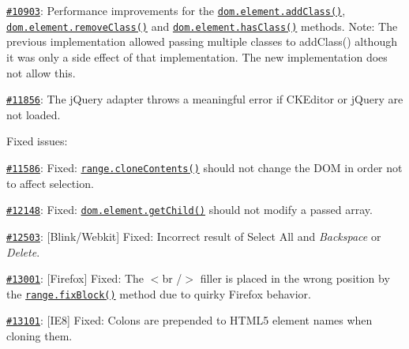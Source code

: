 \begin{DoxyItemize}
\item \href{http://dev.ckeditor.com/ticket/10903}{\tt \#10903}\+: Performance improvements for the \href{http://docs.ckeditor.com/#!/api/CKEDITOR.dom.element-method-addClass}{\tt {\ttfamily dom.\+element.\+add\+Class()}}, \href{http://docs.ckeditor.com/#!/api/CKEDITOR.dom.element-method-removeClass}{\tt {\ttfamily dom.\+element.\+remove\+Class()}} and \href{http://docs.ckeditor.com/#!/api/CKEDITOR.dom.element-method-hasClass}{\tt {\ttfamily dom.\+element.\+has\+Class()}} methods. Note\+: The previous implementation allowed passing multiple classes to {\ttfamily add\+Class()} although it was only a side effect of that implementation. The new implementation does not allow this.
\item \href{http://dev.ckeditor.com/ticket/11856}{\tt \#11856}\+: The j\+Query adapter throws a meaningful error if C\+K\+Editor or j\+Query are not loaded.
\end{DoxyItemize}

Fixed issues\+:


\begin{DoxyItemize}
\item \href{http://dev.ckeditor.com/ticket/11586}{\tt \#11586}\+: Fixed\+: \href{http://docs.ckeditor.com/#!/api/CKEDITOR.dom.range-method-cloneContents}{\tt {\ttfamily range.\+clone\+Contents()}} should not change the D\+OM in order not to affect selection.
\item \href{http://dev.ckeditor.com/ticket/12148}{\tt \#12148}\+: Fixed\+: \href{http://docs.ckeditor.com/#!/api/CKEDITOR.dom.element-method-getChild}{\tt {\ttfamily dom.\+element.\+get\+Child()}} should not modify a passed array.
\item \href{http://dev.ckeditor.com/ticket/12503}{\tt \#12503}\+: \mbox{[}Blink/\+Webkit\mbox{]} Fixed\+: Incorrect result of Select All and {\itshape Backspace} or {\itshape Delete}.
\item \href{http://dev.ckeditor.com/ticket/13001}{\tt \#13001}\+: \mbox{[}Firefox\mbox{]} Fixed\+: The {\ttfamily $<$br /$>$} filler is placed in the wrong position by the \href{http://docs.ckeditor.com/#!/api/CKEDITOR.dom.range-method-fixBlock}{\tt {\ttfamily range.\+fix\+Block()}} method due to quirky Firefox behavior.
\item \href{http://dev.ckeditor.com/ticket/13101}{\tt \#13101}\+: \mbox{[}I\+E8\mbox{]} Fixed\+: Colons are prepended to H\+T\+M\+L5 element names when cloning them.
\end{DoxyItemize}

